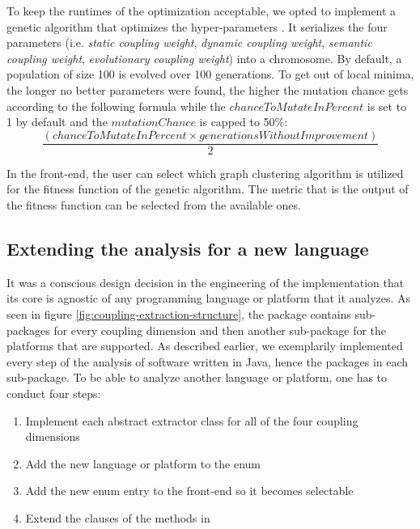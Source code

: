 \documentclass[12pt,a4paper]{report}
\begin{document}
To keep the runtimes of the optimization acceptable, we opted to implement a
genetic algorithm that optimizes the hyper\hyp parameters \cite{eiben2003introduction}.
It serializes the four parameters
(i.e. \textit{static coupling weight}, \textit{
dynamic coupling weight}, \textit{semantic coupling weight}, \textit{
evolutionary coupling weight}) into a chromosome. By default, a population of
size 100 is evolved over 100 generations. To get out of local minima, the
longer no better parameters were found, the higher the mutation chance gets
according to the following formula while the $chanceToMutateInPercent$ is set
to 1 by default and the $mutationChance$ is capped to 50\%:
\[
  \frac{(chanceToMutateInPercent \times generationsWithoutImprovement)}{2}
\]

In the front\hyp end, the user can select which graph clustering algorithm is
utilized for the fitness function of the genetic algorithm.
The metric that is the output of the fitness function can be selected from the
available ones.


\subsection{Extending the analysis for a new language}

It was a conscious design decision in the engineering of the implementation
that its core is agnostic of any programming language or platform that it
analyzes. As seen in figure \ref{fig:coupling-extraction-structure}, the  package contains sub\hyp packages for every coupling
dimension and then another sub\hyp package for the platforms that are
supported. As described earlier, we exemplarily implemented every step of the
analysis of software written in Java, hence the  packages in each
 sub\hyp package. To be able to analyze another language or
platform, one has to conduct four steps:
\begin{enumerate}
    \item Implement each abstract extractor class for all of the four coupling dimensions
    \item Add the new language or platform to the  enum
    \item Add the new enum entry to the front-end so it becomes selectable
    \item Extend the clauses of the methods in 
\end{enumerate}
\end{document}
